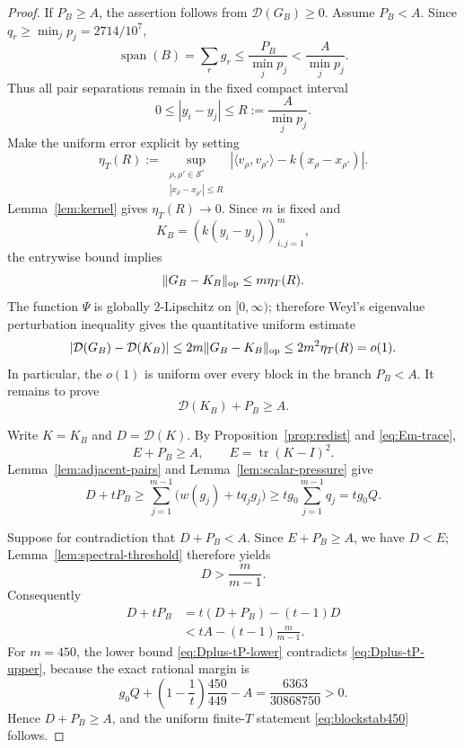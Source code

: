 \documentclass[11pt]{article}
\begin{document}
\begin{proof}
If \(P_B\ge A\), the assertion follows from \(\mathcal D(G_B)\ge0\).
Assume \(P_B<A\).  Since \(q_r\ge\min_jp_j=2714/10^7\),
\[
 \operatorname{span}(B)
 =
 \sum_rg_r
 \le
 \frac{P_B}{\min_jp_j}
 <
 \frac{A}{\min_jp_j}.
\]
Thus all pair separations remain in the fixed compact interval
\[
 0\le |y_i-y_j|\le R:=\frac{A}{\min_jp_j}.
\]
Make the uniform error explicit by setting
\[
 \eta_T(R):=
 \sup_{\substack{\rho,\rho'\in\mathcal S^\circ\\
 |x_\rho-x_{\rho'}|\le R}}
 \left|\langle v_\rho,v_{\rho'}\rangle
       -k(x_\rho-x_{\rho'})\right|.
\]
Lemma~\ref{lem:kernel} gives \(\eta_T(R)\to0\).  Since \(m\) is
fixed and
\[
 K_B=(k(y_i-y_j))_{i,j=1}^m,
\]
the entrywise bound implies
\[
 \|G_B-K_B\|_{\rm op}\le m\eta_T(R).
\]
The function \(\Psi\) is globally $2$-Lipschitz on $[0,\infty)$;
therefore Weyl's eigenvalue perturbation inequality gives the quantitative
uniform estimate
\begin{equation}\label{eq:block-defect-uniform-error}
 \left|\mathcal D(G_B)-\mathcal D(K_B)\right|
 \le 2m\|G_B-K_B\|_{\rm op}
 \le 2m^2\eta_T(R)=o(1).
\end{equation}
In particular, the $o(1)$ is uniform over every block in the branch
\(P_B<A\).  It remains to prove
\[
 \mathcal D(K_B)+P_B\ge A.
\]

Write \(K=K_B\) and \(D=\mathcal D(K)\).  By
Proposition~\ref{prop:redist} and \eqref{eq:Em-trace},
\[
 E+P_B\ge A,
 \qquad
 E=\operatorname{tr}(K-I)^2.
\]
Lemma~\ref{lem:adjacent-pairs} and
Lemma~\ref{lem:scalar-pressure} give
\begin{equation}\label{eq:Dplus-tP-lower}
 D+tP_B
 \ge
 \sum_{j=1}^{m-1}\bigl(w(g_j)+tq_jg_j\bigr)
 \ge
 tg_0\sum_{j=1}^{m-1}q_j
 =
 tg_0Q.
\end{equation}

Suppose for contradiction that \(D+P_B<A\).  Since \(E+P_B\ge A\),
we have \(D<E\); Lemma~\ref{lem:spectral-threshold} therefore yields
\[
 D>\frac{m}{m-1}.
\]
Consequently
\begin{align}
 D+tP_B
 &=
 t(D+P_B)-(t-1)D \nonumber\\
 &<
 tA-(t-1)\frac{m}{m-1}.
 \label{eq:Dplus-tP-upper}
\end{align}
For \(m=450\), the lower bound
\eqref{eq:Dplus-tP-lower} contradicts
\eqref{eq:Dplus-tP-upper}, because the exact rational margin is
\begin{equation}\label{eq:contradiction-margin}
 g_0Q
 +
 \left(1-\frac1t\right)\frac{450}{449}
 -A
 =
 \frac{6363}{30868750}
 >0.
\end{equation}
Hence \(D+P_B\ge A\), and the uniform finite-\(T\) statement
\eqref{eq:blockstab450} follows.
\end{proof}
\end{document}
